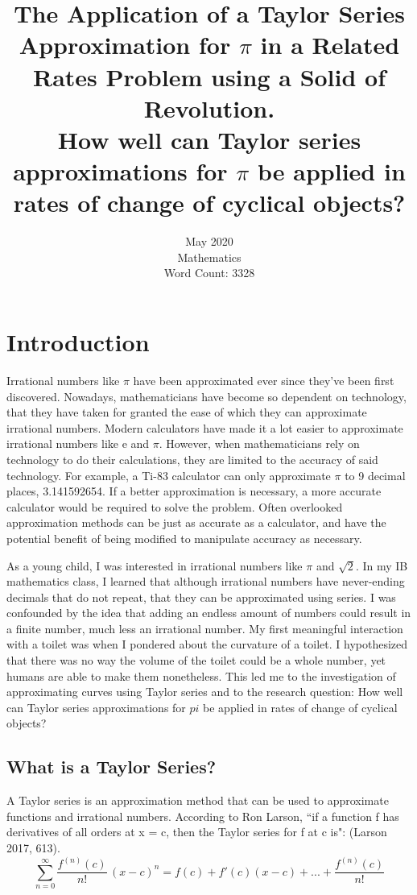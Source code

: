 \documentclass[12pt, titlepage]{article}
\date{\normalsize May 2020 \\ Mathematics \\ Word Count: 3328}
\title{\normalsize The Application of a Taylor Series Approximation for \(\pi\) in a Related Rates Problem using a Solid of Revolution. \bigskip \\  How well can Taylor series approximations for \(\pi\) be applied in rates of change of cyclical objects?}
\begin{document}
\maketitle
\tableofcontents
\newpage

\section{Introduction}
Irrational numbers like \(\pi\) have been approximated ever since they've been first discovered. Nowadays, mathematicians have become so dependent on technology, that they have taken for granted the ease of which they can approximate irrational numbers. Modern calculators have made it a lot easier to approximate irrational numbers like e and \(\pi\). However, when mathematicians rely on technology to do their calculations, they are limited to the accuracy of said technology. For example, a Ti-83 calculator can only approximate \(\pi\) to 9 decimal places, 3.141592654. If a better approximation is necessary, a more accurate calculator would be required to solve the problem. Often overlooked approximation methods can be just as accurate as a calculator, and have the potential benefit of being modified to manipulate accuracy as necessary.

As a young child, I was interested in irrational numbers like \(\pi\) and \(\sqrt{2}\). In my IB mathematics class, I learned that although irrational numbers have never-ending decimals that do not repeat, that they can be approximated using series. I was confounded by the idea that adding an endless amount of numbers could result in a finite number, much less an irrational number. My first meaningful interaction with a toilet was when I pondered about the curvature of a toilet. I hypothesized that there was no way the volume of the toilet could be a whole number, yet humans are able to make them nonetheless. This led me to the investigation of approximating curves using Taylor series and to the research question: How well can Taylor series approximations for \(pi\) be applied in rates of change of cyclical objects?

\subsection{What is a Taylor Series?}
A Taylor series is an approximation method that can be used to approximate functions and irrational numbers. According to Ron Larson, ``if a function f has derivatives of all orders at x = c, then the Taylor series for f at c is": (Larson 2017, 613).
\begin{equation*}
  \sum_{n=0}^{\infty} \frac{f^{(n)}(c)}{n!} \, (x-c)^{n} = f(c) + f'(c)(x-c) + ... +  \frac{f^{(n)}(c)}{n!}
\end{equation*}
\end{document}
